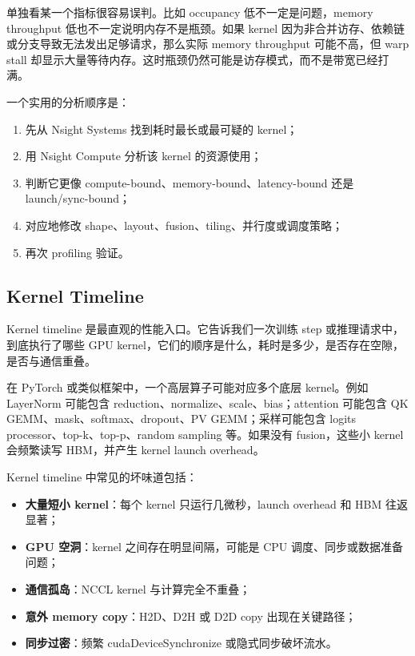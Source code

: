 单独看某一个指标很容易误判。比如 occupancy 低不一定是问题，memory throughput 低也不一定说明内存不是瓶颈。如果 kernel 因为非合并访存、依赖链或分支导致无法发出足够请求，那么实际 memory throughput 可能不高，但 warp stall 却显示大量等待内存。这时瓶颈仍然可能是访存模式，而不是带宽已经打满。

一个实用的分析顺序是：

\begin{enumerate}
  \item 先从 Nsight Systems 找到耗时最长或最可疑的 kernel；
  \item 用 Nsight Compute 分析该 kernel 的资源使用；
  \item 判断它更像 compute-bound、memory-bound、latency-bound 还是 launch/sync-bound；
  \item 对应地修改 shape、layout、fusion、tiling、并行度或调度策略；
  \item 再次 profiling 验证。
\end{enumerate}

\subsection{Kernel Timeline}
\label{subsec:kernel-timeline}

Kernel timeline 是最直观的性能入口。它告诉我们一次训练 step 或推理请求中，到底执行了哪些 GPU kernel，它们的顺序是什么，耗时是多少，是否存在空隙，是否与通信重叠。

在 PyTorch 或类似框架中，一个高层算子可能对应多个底层 kernel。例如 LayerNorm 可能包含 reduction、normalize、scale、bias；attention 可能包含 QK GEMM、mask、softmax、dropout、PV GEMM；采样可能包含 logits processor、top-k、top-p、random sampling 等。如果没有 fusion，这些小 kernel 会频繁读写 HBM，并产生 kernel launch overhead。

Kernel timeline 中常见的坏味道包括：

\begin{itemize}
  \item \textbf{大量短小 kernel}：每个 kernel 只运行几微秒，launch overhead 和 HBM 往返显著；
  \item \textbf{GPU 空洞}：kernel 之间存在明显间隔，可能是 CPU 调度、同步或数据准备问题；
  \item \textbf{通信孤岛}：NCCL kernel 与计算完全不重叠；
  \item \textbf{意外 memory copy}：H2D、D2H 或 D2D copy 出现在关键路径；
  \item \textbf{同步过密}：频繁 cudaDeviceSynchronize 或隐式同步破坏流水。
\end{itemize}

